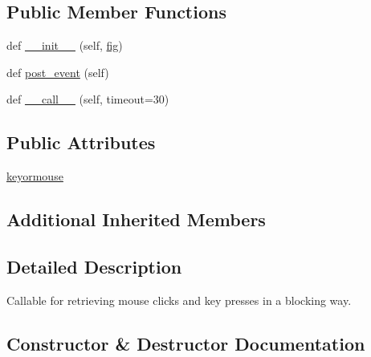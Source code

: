 \subsection*{Public Member Functions}
\begin{DoxyCompactItemize}
\item 
def \hyperlink{classmatplotlib_1_1blocking__input_1_1BlockingKeyMouseInput_a381b300bb9b15d1da6313585739e10e8}{\+\_\+\+\_\+init\+\_\+\+\_\+} (self, \hyperlink{classmatplotlib_1_1blocking__input_1_1BlockingInput_aee554aa34b7799bef4ad2406ed6a7e0c}{fig})
\item 
def \hyperlink{classmatplotlib_1_1blocking__input_1_1BlockingKeyMouseInput_a4059dda95957ee84ced2476367c03fb3}{post\+\_\+event} (self)
\item 
def \hyperlink{classmatplotlib_1_1blocking__input_1_1BlockingKeyMouseInput_a43b850c947e349147850b63f167bae34}{\+\_\+\+\_\+call\+\_\+\+\_\+} (self, timeout=30)
\end{DoxyCompactItemize}
\subsection*{Public Attributes}
\begin{DoxyCompactItemize}
\item 
\hyperlink{classmatplotlib_1_1blocking__input_1_1BlockingKeyMouseInput_a334fc03f82abaa83aea6a67e5682641e}{keyormouse}
\end{DoxyCompactItemize}
\subsection*{Additional Inherited Members}


\subsection{Detailed Description}
\begin{DoxyVerb}Callable for retrieving mouse clicks and key presses in a blocking way.
\end{DoxyVerb}
 

\subsection{Constructor \& Destructor Documentation}
\mbox{\label{classmatplotlib_1_1blocking__input_1_1BlockingKeyMouseInput_a381b300bb9b15d1da6313585739e10e8}} 
